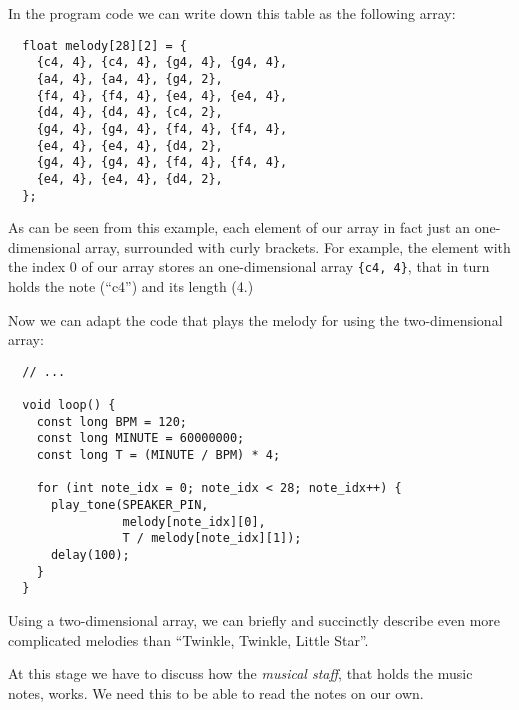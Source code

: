 \documentclass[../sparc.tex]{subfiles}
\begin{document}
In the program code we can write down this table as the following array:

\begin{verbatim}
  float melody[28][2] = {
    {c4, 4}, {c4, 4}, {g4, 4}, {g4, 4},
    {a4, 4}, {a4, 4}, {g4, 2},
    {f4, 4}, {f4, 4}, {e4, 4}, {e4, 4},
    {d4, 4}, {d4, 4}, {c4, 2},
    {g4, 4}, {g4, 4}, {f4, 4}, {f4, 4},
    {e4, 4}, {e4, 4}, {d4, 2},
    {g4, 4}, {g4, 4}, {f4, 4}, {f4, 4},
    {e4, 4}, {e4, 4}, {d4, 2},
  };
\end{verbatim}

As can be seen from this example, each element of our array in fact just an
one-dimensional array, surrounded with curly brackets.  For example, the element
with the index 0 of our array stores an one-dimensional array \texttt{\{c4,
 4\}}, that in turn holds the note (``c4'') and its length (4.)

Now we can adapt the code that plays the melody for using the two-dimensional
array:

\begin{verbatim}
  // ...

  void loop() {
    const long BPM = 120;
    const long MINUTE = 60000000;
    const long T = (MINUTE / BPM) * 4;

    for (int note_idx = 0; note_idx < 28; note_idx++) {
      play_tone(SPEAKER_PIN,
                melody[note_idx][0],
                T / melody[note_idx][1]);
      delay(100);
    }
  }
\end{verbatim}

Using a two-dimensional array, we can briefly and succinctly describe even more
complicated melodies than ``Twinkle, Twinkle, Little Star''.

At this stage we have to discuss how the \emph{musical staff}, that holds the
music notes, works.  We need this to be able to read the notes on our own.
\end{document}
